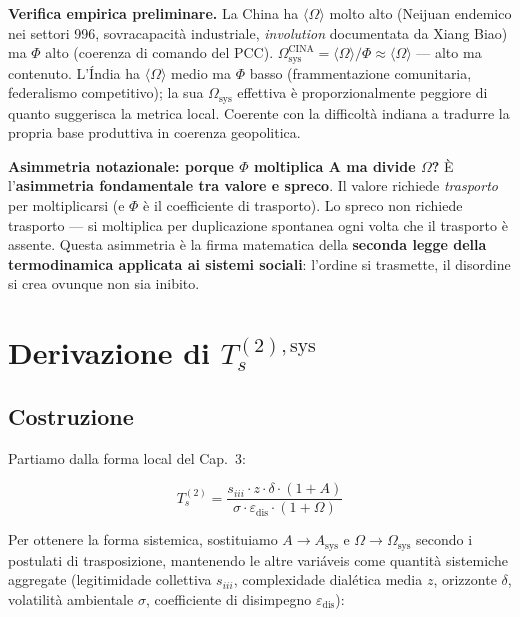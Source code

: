 \Proved{} \textbf{Verifica empirica preliminare.} La China ha
\(\langle \Omega \rangle\) molto alto (Neijuan endemico nei settori 996,
sovracapacità industriale, \emph{involution} documentata da Xiang Biao)
ma \(\Phi\) alto (coerenza di comando del PCC).
\(\Omega_{\text{sys}}^{\text{CINA}} = \langle\Omega\rangle/\Phi \approx \langle\Omega\rangle\)
--- alto ma contenuto. L'Índia ha \(\langle \Omega \rangle\) medio ma
\(\Phi\) basso (frammentazione comunitaria, federalismo competitivo); la
sua \(\Omega_{\text{sys}}\) effettiva è proporzionalmente peggiore di
quanto suggerisca la metrica local. Coerente con la difficoltà indiana
a tradurre la propria base produttiva in coerenza geopolitica.

\Conj{} \textbf{Asimmetria notazionale: porque $\Phi$ moltiplica A ma divide
$\Omega$?} È l'\textbf{asimmetria fondamentale tra valore e spreco}. Il valore
richiede \emph{trasporto} per moltiplicarsi (e \(\Phi\) è il
coefficiente di trasporto). Lo spreco non richiede trasporto --- si
moltiplica per duplicazione spontanea ogni volta che il trasporto è
assente. Questa asimmetria è la firma matematica della \textbf{seconda
legge della termodinamica applicata ai sistemi sociali}: l'ordine si
trasmette, il disordine si crea ovunque non sia inibito.



\section{\texorpdfstring{Derivazione di
\(T_s^{(2),\text{sys}}\)}{Derivazione di T\_s\^{}\{(2),\textbackslash text\{sys\}\}}}\label{derivazione-di-t_s2textsys}

\subsection{Costruzione}\label{costruzione}

Partiamo dalla forma local del Cap.~3:

\[
T_s^{(2)} = \frac{s_{iii} \cdot z \cdot \delta \cdot (1 + A)}{\sigma \cdot \varepsilon_{\text{dis}} \cdot (1 + \Omega)}
\]

Per ottenere la forma sistemica, sostituiamo \(A \to A_{\text{sys}}\) e
\(\Omega \to \Omega_{\text{sys}}\) secondo i postulati di trasposizione,
mantenendo le altre variáveis come quantità sistemiche aggregate
(legitimidade collettiva \(s_{iii}\), complexidade dialética media \(z\),
orizzonte \(\delta\), volatilità ambientale \(\sigma\), coefficiente di
disimpegno \(\varepsilon_{\text{dis}}\)):

